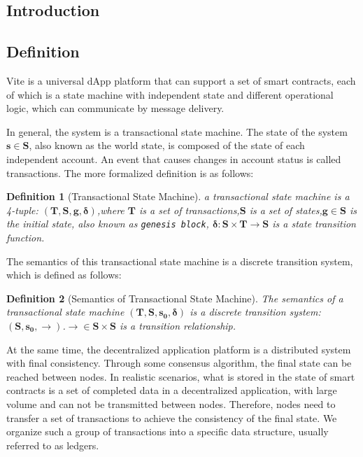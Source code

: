 \documentclass[UTF8,nofonts]{article}
\newtheorem{definition}{Definition}[section]
\begin{document}
\begin{multicols}{2}

\section{Introduction}
\subsection{Definition}

Vite is a universal dApp platform that can support a set of smart contracts, each of which is a state machine with independent state and different operational logic, which can communicate by message delivery.

In general, the system is a transactional state machine. The state of the system $\boldsymbol{s}\in\boldsymbol{S}$, also known as the world state, is composed of the state of each independent account. An event that causes changes in account status is called transactions. The more formalized definition is as follows:

\begin{definition}[Transactional State Machine] \label{def:fsm}
a transactional state machine is a 4-tuple: $(\boldsymbol{T},\boldsymbol{S},\boldsymbol{g},\boldsymbol{{\delta}})$,where $\boldsymbol{T}$ is a set of transactions,$\boldsymbol{S}$ is a set of states,$\boldsymbol{g} \in \boldsymbol{S}$ is the initial state, also known as \texttt{genesis block}, $\boldsymbol{{\delta}:\boldsymbol{S}\times\boldsymbol{T}\rightarrow\boldsymbol{S}}$ is a state transition function.
\end{definition}

The semantics of this transactional state machine is a discrete transition system, which is defined as follows:
\begin{definition}[Semantics of Transactional State Machine] \label{def:semantics}
The semantics of a transactional state machine $(\boldsymbol{T},\boldsymbol{S},\boldsymbol{s_{0}},\boldsymbol{{\delta}})$ is a discrete transition system:  $(\boldsymbol{S},\boldsymbol{s_{0}},\boldsymbol{\rightarrow})$.$\boldsymbol{\rightarrow} \in \boldsymbol{S}\times\boldsymbol{S}$ is a transition relationship.
\end{definition}

At the same time, the decentralized application platform is a distributed system with final consistency. Through some consensus algorithm, the final state can be reached between nodes. In realistic scenarios, what is stored in the state of smart contracts is a set of completed data in a decentralized application, with large volume and can not be transmitted between nodes. Therefore, nodes need to transfer a set of transactions to achieve the consistency of the final state. We organize such a group of transactions into a specific data structure, usually referred to as ledgers.


\end{multicols}
\end{document}
